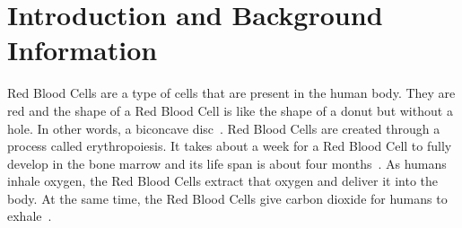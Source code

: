 \section{Introduction and Background Information}
\label{sec:introduction-and-background-information}

Red Blood Cells are a type of cells that are present in the human body. They are red and the shape of a Red Blood Cell is like the shape of a donut but without a hole. In other words, a biconcave disc~\cite{article1}. Red Blood Cells are created through a process called erythropoiesis. It takes about a week for a Red Blood Cell to fully develop in the bone marrow and its life span is about four months~\cite{article2}. As humans inhale oxygen, the Red Blood Cells extract that oxygen and deliver it into the body. At the same time, the Red Blood Cells give carbon dioxide for humans to exhale~\cite{web1}.
